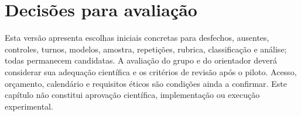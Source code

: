 \section{Decisões para avaliação}

Esta versão apresenta escolhas iniciais concretas para desfechos, ausentes, controles, turnos, modelos, amostra, repetições, rubrica, classificação e análise; todas permanecem candidatas. A avaliação do grupo e do orientador deverá considerar sua adequação científica e os critérios de revisão após o piloto. Acesso, orçamento, calendário e requisitos éticos são condições ainda a confirmar. Este capítulo não constitui aprovação científica, implementação ou execução experimental.
